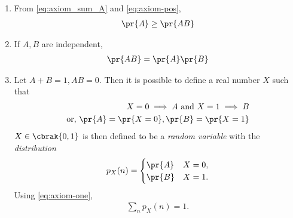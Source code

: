 \begin{enumerate}[label=\thesubsection.\arabic*,ref=\thesubsection.\theenumi]
\begin{proof}
\begin{align}
\label{eq:axiom_sum_ApB}
\end{align}
From 
\eqref{eq:axiom_sum_A}
and 
\eqref{eq:axiom_sum_ApB},
we obtain
\eqref{eq:axiom_sum_AB}.
		\end{proof}
	\item 
From \eqref{eq:axiom_sum_A}
and 
	\eqref{eq:axiom-pos},
\begin{align}
	\label{eq:axiom-prod-ge}
	\pr{A} \ge \pr{AB}
\end{align}
\item If $A, B$ are independent,
\begin{align}
	\pr{AB} = \pr{A}\pr{B}
\label{eq:axiom-ind}
\end{align}
\item Let $A + B = 1, AB = 0$.  Then it is possible to define a real number $X$ such that 
\begin{align}
	X = 0 \implies A \text{ and } X = 1 \implies B
	\\
	\text{or, }
	\pr{A} = \pr{X=0},
	\pr{B} = \pr{X=1}
\end{align}
$X \in \cbrak{0,1}$ is then defined to be a {\em random variable} with the {\em distribution}
\begin{align}
	\label{eq:dist}
	p_X(n) = 
	\begin{cases}
		\pr{A} & X=0,
		\\
		\pr{B} & X=1.
\end{cases}
\end{align}
Using 
	\eqref{eq:axiom-one},
\begin{align}
	\sum_n p_X(n) = 1.
	\label{eq:dist-axiom-one}
\end{align}
\end{enumerate}
